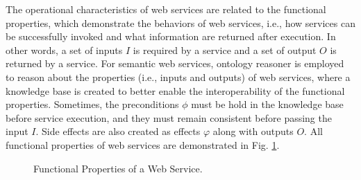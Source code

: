 The operational characteristics of web services are related to the functional properties, which demonstrate the behaviors of web services, i.e., how services can be successfully invoked and what information are returned after execution. In other words, a set of inputs $I$ is required by a service and a set of output $O$ is returned by a service. For semantic web services, ontology reasoner is employed to reason about the properties (i.e., inputs and outputs) of web services, where a knowledge base is created to better enable the interoperability of the functional properties. Sometimes, the preconditions $\phi$ must be hold in the knowledge base before service execution, and they must remain consistent before passing the input $I$. Side effects are also created as effects $\varphi$ along with outputs $O$. All functional properties of web services are demonstrated in Fig. \ref{fig:ws}.


\begin{figure}
\centerline{
}
\caption{Functional Properties of a Web Service.}
\label{fig:ws}
\end{figure}


